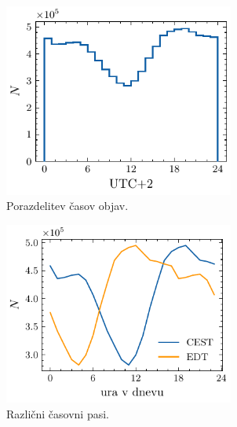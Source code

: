 \documentclass[11pt, oneside]{article}
\theoremstyle{definition}
\begin{document}
\begin{figure}[h!]
    \centering
    \begin{subfigure}[b]{0.49\textwidth}
        \centering
        \includegraphics[width=0.83\textwidth]{reddit_times_dist_all.pdf}
        \caption{Porazdelitev časov objav.}
        \label{fig: times1}
    \end{subfigure}
    \hfill
    \begin{subfigure}[b]{0.49\textwidth}
        \centering
        \includegraphics[width=0.83\textwidth]{reddit_timezones_dist.pdf}
        \caption{Različni časovni pasi.}
        \label{fig: times2}
    \end{subfigure}
    \hfill
    \begin{subfigure}[b]{0.49\textwidth}
        \centering

\end{subfigure}
\end{figure}
\end{document}
